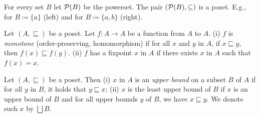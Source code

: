    


\begin{example}
 For every set $B$ let $\mathcal{P}(B)$ be the powerset. 
 The pair $(\mathcal{P}(B),\subseteq)$ is a poset. E.g., for $B\coloneqq \{a\}$ (left) and for $B \coloneqq \{a,b\}$ (right).
 \begin{center}
 
 \end{center}

\end{example}


\begin{definition}[Fixpoint]
Let $(A,\sqsubseteq)$ be a poset. Let $f\colon A\to A$ be a function from $A$ to $A$.
(i) $f$ is \emph{monotone} (order-preserving, homomorphism) if for all $x$ and $y$ in $A$, if $x \sqsubseteq y$, then $f(x) \sqsubseteq f(y)$. (ii) $f$ has a fixpoint $x$ in $A$ if there exists $x$ in $A$ such that $f(x)=x$. 
\end{definition}


\begin{definition}
    Let $(A,\sqsubseteq)$ be a poset. Then (i) $x$ in $A$ is an \emph{upper bound} on a subset $B$ of $A$ if for all $y$ in $B$, it holds that $y \sqsubseteq x$; 
    (ii) $x$ is the least upper bound of $B$ if $x$ is an upper bound of $B$ and for all upper bounds $y$ of $B$, we have $x \sqsubseteq y$. We denote such $x$ by $\bigsqcup B$.
\end{definition}

